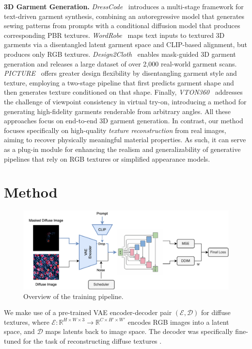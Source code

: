 \documentclass[11pt,twocolumn]{article}
\begin{document}
\textbf{3D Garment Generation.}  
\textit{DressCode}~\cite{dresscode} introduces a multi-stage framework for text-driven garment synthesis, combining an autoregressive model that generates sewing patterns from prompts with a conditional diffusion model that produces corresponding PBR textures. \textit{WordRobe}~\cite{WordRobe} maps text inputs to textured 3D garments via a disentangled latent garment space and CLIP-based alignment, but produces only RGB textures. \textit{Design2Cloth}~\cite{design2cloth} enables mask-guided 3D garment generation and releases a large dataset of over 2{,}000 real-world garment scans. \textit{PICTURE}~\cite{picture} offers greater design flexibility by disentangling garment style and texture, employing a two-stage pipeline that first predicts garment shape and then generates texture conditioned on that shape. Finally, \textit{VTON360}~\cite{vton360} addresses the challenge of viewpoint consistency in virtual try-on, introducing a method for generating high-fidelity garments renderable from arbitrary angles.  
All these approaches focus on end-to-end 3D garment generation. In contrast, our method focuses specifically on high-quality \textit{texture reconstruction} from real images, aiming to recover physically meaningful material properties. As such, it can serve as a plug-in module for enhancing the realism and generalizability of generative pipelines that rely on RGB textures or simplified appearance models.


\section{Method}

\begin{figure}[t]
  \centering
  \includegraphics[width=1.0\textwidth]{figures/pbr_train_overview.png}
  \caption{Overview of the training pipeline.}
  \label{fig:trn-overview}
\end{figure}

We make use of a pre-trained VAE \cite{vae} encoder-decoder pair $(\mathcal{E}, \mathcal{D})$ for diffuse textures, where $\mathcal{E}: \mathbb{R}^{H \times W \times 3} \rightarrow \mathbb{R}^{C \times H' \times W'}$ encodes RGB images into a latent space, and $\mathcal{D}$ maps latents back to image space. The decoder was specifically fine-tuned for the task of reconstructing diffuse textures \cite{dresscode}.
\end{document}
